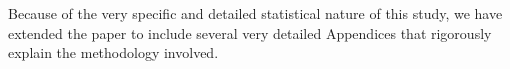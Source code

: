 Because of the very specific and detailed statistical nature of this study, we have
extended the paper to include several very detailed Appendices that rigorously
explain the methodology involved.

